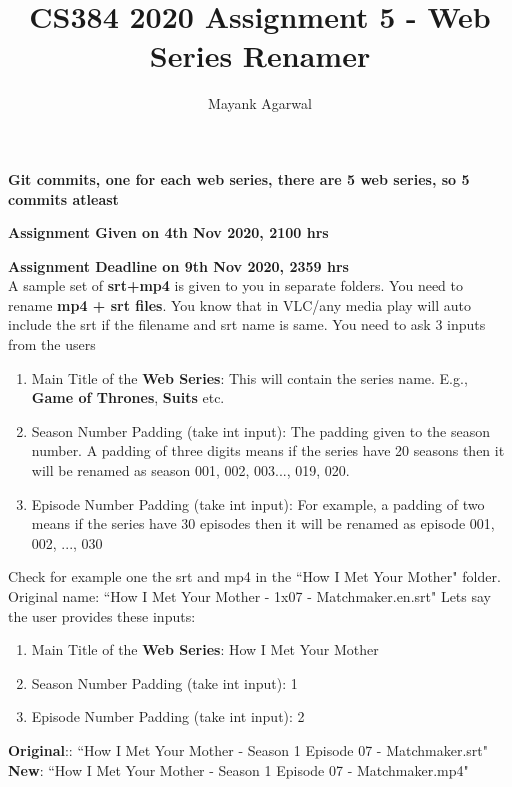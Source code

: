 \documentclass[12pt]{article}
\title{CS384 2020 Assignment 5 - Web Series Renamer}
\author{Mayank Agarwal}
\begin{document}
{\let\newpage\relax\maketitle} 

\textbf{Git commits, one for each web series, there are 5 web series, so 5 commits atleast}


\textbf{Assignment Given on 4th Nov 2020, 2100 hrs}

\textbf{Assignment Deadline on 9th Nov 2020, 2359 hrs}\\

A sample set of \textbf{srt+mp4} is given to you in separate folders. You need to rename \textbf{mp4 + srt files}. You know that in VLC/any media play will auto include the srt if the filename and srt name is same. You need to ask 3 inputs from the users

\begin{enumerate}
	\item Main Title of the \textbf{Web Series}: This will contain the series name. E.g.,  \textbf{Game of Thrones},  \textbf{Suits} etc. 
	\item Season Number Padding (take int input): The padding given to the season number.  A padding of three digits means if the series have 20 seasons then it will be renamed as season 001, 002, 003..., 019, 020.
	\item Episode Number Padding (take int input): For example,  a padding of two means if the series have 30 episodes then it will be renamed as episode 001, 002, ..., 030
\end{enumerate}


Check for example one the srt and mp4 in the ``How I Met Your Mother" folder. 
Original name:  ``How I Met Your Mother - 1x07 - Matchmaker.en.srt" 
Lets say the user provides these inputs: 


\begin{enumerate}
	\item Main Title of the \textbf{Web Series}: How I Met Your Mother
	\item Season Number Padding (take int input): 1
	\item Episode Number Padding (take int input): 2
\end{enumerate} 



\noindent
\textbf{Original}:: ``How I Met Your Mother - Season 1 Episode 07 - Matchmaker.srt"  \\
\textbf{New}: ``How I Met Your Mother - Season 1 Episode 07 - Matchmaker.mp4" \\
\end{document}
